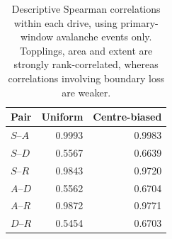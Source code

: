 \begin{table}[htbp]
\centering
\caption{Descriptive Spearman correlations within each drive, using primary-window avalanche events only. Topplings, area and extent are strongly rank-correlated, whereas correlations involving boundary loss are weaker.}
\label{tab:correlations}
\begin{tabular}{@{}lrr@{}}
\toprule
Pair & Uniform & Centre-biased\\
\midrule
$S$--$A$ & 0.9993 & 0.9983\\
$S$--$D$ & 0.5567 & 0.6639\\
$S$--$R$ & 0.9843 & 0.9720\\
$A$--$D$ & 0.5562 & 0.6704\\
$A$--$R$ & 0.9872 & 0.9771\\
$D$--$R$ & 0.5454 & 0.6703\\
\bottomrule
\end{tabular}
\end{table}
